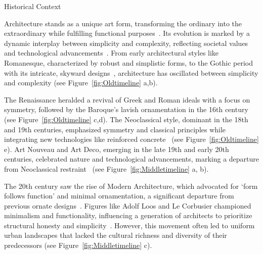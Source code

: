 



Historical Context


Architecture stands as a unique art form, transforming the ordinary into the extraordinary while fulfilling functional purposes~\cite{Hnin2022}.
Its evolution is marked by a dynamic interplay between simplicity and complexity, reflecting societal values and technological advancements~\cite{Economakis2023}.
From early architectural styles like Romanesque, characterized by robust and simplistic forms, to the Gothic period with its intricate, skyward designs~\cite{Stacbond2020}, architecture has oscillated between simplicity and complexity (see Figure~\ref{fig:Oldtimeline} a,b).

The Renaissance heralded a revival of Greek and Roman ideals with a focus on symmetry, followed by the Baroque's lavish ornamentation in the 16th century~\cite{Economakis2023} (see Figure~\ref{fig:Oldtimeline} c,d).
The Neoclassical style, dominant in the 18th and 19th centuries, emphasized symmetry and classical principles while integrating new technologies like reinforced concrete~\cite{Economakis2023} (see Figure~\ref{fig:Oldtimeline} e).
Art Nouveau and Art Deco, emerging in the late 19th and early 20th centuries, celebrated nature and technological advancements, marking a departure from Neoclassical restraint~\cite{Salas2018, Arora2023} (see Figure~\ref{fig:Middletimeline} a, b).

The 20th century saw the rise of Modern Architecture, which advocated for `form follows function' and minimal ornamentation, a significant departure from previous ornate designs~\cite{Gage2015}.
Figures like Adolf Loos and Le Corbusier championed minimalism and functionality, influencing a generation of architects to prioritize structural honesty and simplicity~\cite{Saglam2014}.
However, this movement often led to uniform urban landscapes that lacked the cultural richness and diversity of their predecessors (see Figure~\ref{fig:Middletimeline} c).

